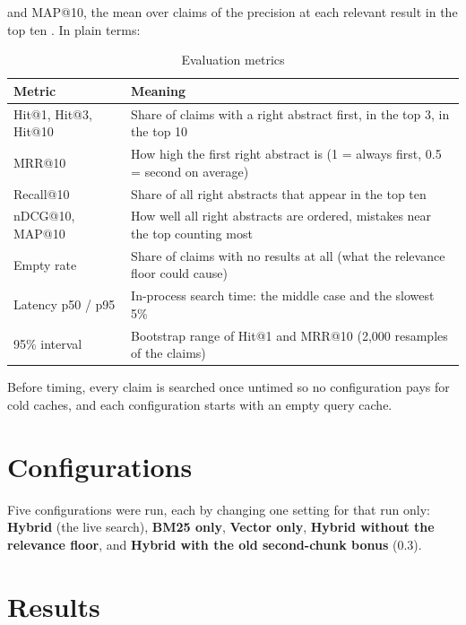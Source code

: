 and MAP@10, the mean over claims of the precision at each relevant result in
the top ten \cite{manning2008ir,jarvelin2002ndcg}. In plain terms:

\begin{table}[H]
\centering
\small
\begin{tabularx}{\textwidth}{p{} L}
\toprule
\textbf{Metric} & \textbf{Meaning} \\
\midrule
Hit@1, Hit@3, Hit@10 & Share of claims with a right abstract first, in the top 3, in the top 10 \\
MRR@10 & How high the first right abstract is (1 = always first, 0.5 = second on average) \\
Recall@10 & Share of all right abstracts that appear in the top ten \\
nDCG@10, MAP@10 & How well all right abstracts are ordered, mistakes near the top counting most \\
Empty rate & Share of claims with no results at all (what the relevance floor could cause) \\
Latency p50 / p95 & In-process search time: the middle case and the slowest 5\% \\
95\% interval & Bootstrap range of Hit@1 and MRR@10 (2{,}000 resamples of the claims) \cite{efron1993bootstrap} \\
\bottomrule
\end{tabularx}
\caption{Evaluation metrics}
\label{tab:metrics}
\end{table}

Before timing, every claim is searched once untimed so no configuration
pays for cold caches, and each configuration starts with an empty query
cache.

\section{Configurations}

Five configurations were run, each by changing one setting for that run
only: \textbf{Hybrid} (the live search), \textbf{BM25 only},
\textbf{Vector only}, \textbf{Hybrid without the relevance floor}, and
\textbf{Hybrid with the old second-chunk bonus} (0.3).

\section{Results}

